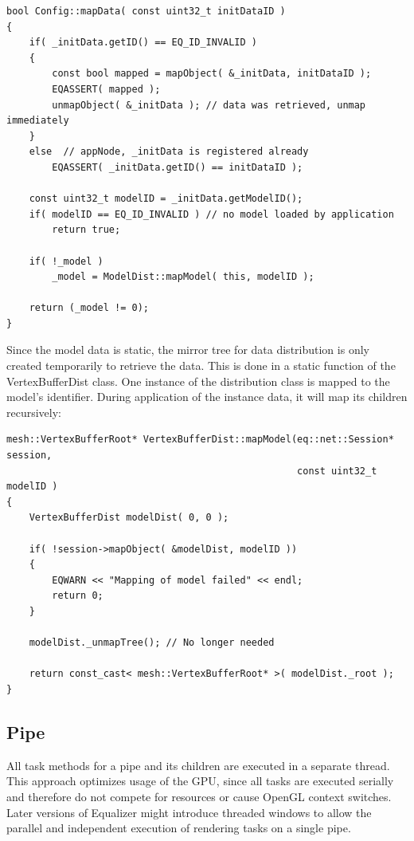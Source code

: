 \documentclass[10pt,a4]{scrartcl}
\begin{document}
{\footnotesize\begin{lstlisting}
bool Config::mapData( const uint32_t initDataID )
{
    if( _initData.getID() == EQ_ID_INVALID )
    {
        const bool mapped = mapObject( &_initData, initDataID );
        EQASSERT( mapped );
        unmapObject( &_initData ); // data was retrieved, unmap immediately
    }
    else  // appNode, _initData is registered already
        EQASSERT( _initData.getID() == initDataID );

    const uint32_t modelID = _initData.getModelID();
    if( modelID == EQ_ID_INVALID ) // no model loaded by application
        return true;

    if( !_model )
        _model = ModelDist::mapModel( this, modelID );

    return (_model != 0);
}
\end{lstlisting}}

Since the model data is static, the mirror tree for data distribution
is only created temporarily to retrieve the data. This is done in a
static function of the \textsf{VertexBufferDist} class. One instance of
the distribution class is mapped to the model's identifier. During
application of the instance data, it will map its children recursively:


{\footnotesize\begin{lstlisting}
mesh::VertexBufferRoot* VertexBufferDist::mapModel(eq::net::Session* session,
                                                   const uint32_t modelID )
{
    VertexBufferDist modelDist( 0, 0 );

    if( !session->mapObject( &modelDist, modelID ))
    {
        EQWARN << "Mapping of model failed" << endl;
        return 0;
    }

    modelDist._unmapTree(); // No longer needed    

    return const_cast< mesh::VertexBufferRoot* >( modelDist._root );
}
\end{lstlisting}}%

\subsection{Pipe}

All task methods for a pipe and its children are executed in a separate
thread. This approach optimizes usage of the GPU, since all
tasks are executed serially and therefore do not compete for resources
or cause OpenGL context switches. Later versions of Equalizer might
introduce threaded windows to allow the parallel and independent
execution of rendering tasks on a single pipe.
\end{document}
